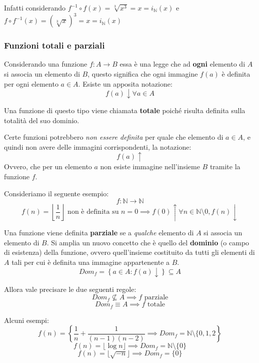 \documentclass{article}
\begin{document}
Infatti considerando $f^{-1}\circ f(x) = \sqrt[3]{x^3}=x=i_\mathbb{N}(x)$ e $f\circ f^{-1}(x)=(\sqrt[3]{x})^3=x=i_\mathbb{N}(x)$

\subsubsection{Funzioni totali e parziali}
Considerando una funzione $f:A\rightarrow B$ essa è una legge che ad \textbf{ogni} elemento di $A$ si associa
un elemento di $B$, questo significa che ogni immagine $f(a)$ è definita per ogni elemento $a\in A$. Esiste
un apposita notazione:
$$f(a)\downarrow \forall a\in A$$

Una funzione di questo tipo viene chiamata \textbf{totale} poiché risulta definita sulla totalità del suo dominio.

Certe funzioni potrebbero \textit{non essere definita} per quale che elemento di $a\in A$, e quindi non avere delle immagini corrispondenti, la notazione:
$$f(a)\uparrow$$
Ovvero, che per un elemento $a$ non esiste immagine nell'insieme $B$ tramite la funzione $f$.

Consideriamo il seguente esempio:
$$f:\mathbb{N}\rightarrow\mathbb{N}$$
$$f(n)=\left\lfloor\frac{1}{n}\right\rfloor \text{ non è definita su } n=0\implies f(0)\uparrow \forall n\in\mathbb{N}\setminus{0}, f(n)\downarrow$$

Una funzione viene definita \textbf{parziale} se a \textit{qualche} elemento di $A$ si associa un elemento di $B$. Si amplia un nuovo concetto che è quello del \textbf{dominio} (o campo di esistenza) della funzione,
ovvero quell'insieme costituito da tutti gli elementi di $A$ tali per cui è definita una immagine appartenente a $B$.
$$Dom_f=\left\{a\in A : f(a)\downarrow \right\}\subseteq A$$

Allora vale precisare le due seguenti regole:
$$Dom_f\nsubseteq A\implies f\text{ parziale}$$
$$Dom_f\equiv A\implies f \text{ totale}$$

Alcuni esempi:
$$f(n)=\left\{\frac{1}{n}+\frac{1}{(n-1)(n-2)}\implies Dom_f=\mathbb{N}\setminus\{0,1,2\right\}$$
$$f(n)=\lfloor\log{n}\rfloor\implies Dom_f=\mathbb{N}\setminus\{0\}$$
$$f(n)=\lfloor\sqrt{-n}\rfloor \implies Dom_f=\{0\}$$
\end{document}
